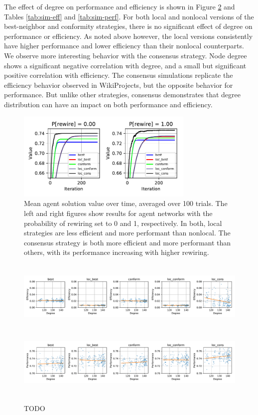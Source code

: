 \documentclass[10pt,twocolumn]{article}
\newcommand{\+}{\phantom{-}}
\begin{document}
The effect of degree on performance and efficiency is shown in Figure \ref{fig:deg-eff-perf} and
Tables \ref{tab:sim-eff} and \ref{tab:sim-perf}.
For both local and nonlocal versions of the best-neighbor and conformity strategies,
there is no significant effect of degree on performance or efficiency.
As noted above however, the local versions consistently have higher performance and lower efficiency
than their nonlocal counterparts.
We observe more interesting behavior with the consensus strategy.
Node degree shows a significant negative correlation with degree,
and a small but significant positive correlation with efficiency.
The consensus simulations replicate the efficiency behavior observed in WikiProjects,
but the opposite behavior for performance.
But unlike other strategies, consensus demonstrates that degree distribution can have an
impact on both performance and efficiency.

\begin{figure}
\includegraphics[width=3.33in,height=1.67in]{fig-val-iter.pdf}
\caption{
Mean agent solution value over time, averaged over 100 trials.
The left and right figures show results for agent networks with the probability of
rewiring set to 0 and 1, respectively.
In both, local strategies are less efficient and more performant than nonlocal.
The consensus strategy is both more efficient and more performant than others,
with its performance increasing with higher rewiring.
\label{fig:val-iter}
}
\end{figure}

\begin{figure}
\includegraphics[width=6.67in,height=1.33in]{fig-deg-eff.pdf}
\includegraphics[width=6.67in,height=1.33in]{fig-deg-perf.pdf}
\caption{
TODO
\label{fig:deg-eff-perf}
}
\end{figure}
\end{document}
